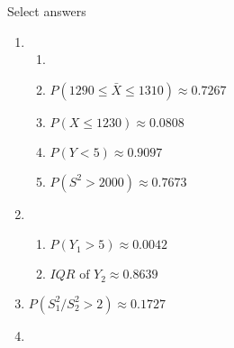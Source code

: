 \documentclass{article}
\begin{document}
Select answers\bigskip
\begin{enumerate}
    \item 
    \begin{enumerate}
        \item 
        \item $P(1290 \le \bar{X} \le 1310) \approx 0.7267$
        \item $P(X \le 1230) \approx 0.0808$
        \item $P(Y < 5) \approx 0.9097$
        \item $P(S^2 > 2000) \approx 0.7673$
    \end{enumerate}
    
    \item 
    \begin{enumerate}
        \item $P(Y_1 > 5) \approx 0.0042$
        \item $IQR \text{ of } Y_2 \approx 0.8639$
    \end{enumerate}
    
    \item $P(S_1^2 / S_2^2 > 2) \approx 0.1727$
    
    \item 
            
\end{enumerate}
\end{document}
